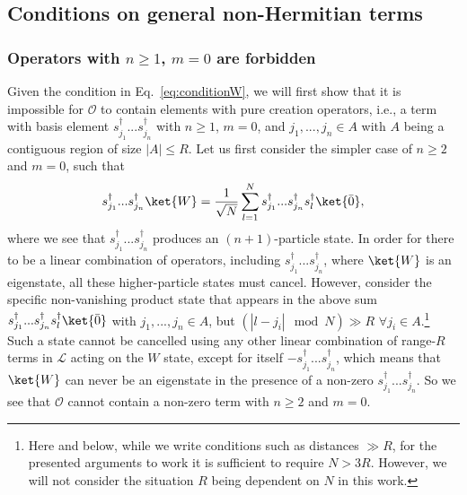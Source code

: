 \documentclass[prx,letterpaper,aps,superscriptaddress,floatfix,twocolumn,nofootinbib]{revtex4-2}
\theoremstyle{definition}
\begin{document}
%
\subsection{Conditions on general non-Hermitian terms}\label{sec:nHconditions}
%
\subsubsection{Operators with $n\geq1$, $m= 0$ are forbidden}
\label{sec:creationforbidden}
%
Given the condition in Eq.~\eqref{eq:conditionW}, we will first show that it is impossible for $\mathcal{O}$ to contain elements with pure creation operators, i.e., a term with basis element $s^\dag_{j_1}...s^\dag_{j_n}$ 
with $n\geq 1$, $m=0$, and $j_1,...,j_n\in A$ with $A$ being a contiguous region of size $|A|\leq R$.
%
Let us first consider the simpler case of $n\geq 2$ and $m=0$, such that
\begin{equation}
s^\dag_{j_1}...s^\dag_{j_n}\ket{W}=\frac{1}{\sqrt{N}}\sum_{l=1}^N s^\dag_{j_1}...s^\dag_{j_n}s_l^\dag\ket{\bar{0}},
\end{equation}
where we see that $s^\dag_{j_1}...s^\dag_{j_n}$ produces an $(n+1)$-particle state.
%
In order for there to be a linear combination of operators, including $s^\dag_{j_1}...s^\dag_{j_n}$, where $\ket{W}$ is an eigenstate, all these higher-particle states must cancel.
%
However, consider the specific non-vanishing product state that appears in the above sum
$s^\dag_{j_1}...s^\dag_{j_n}s_l^\dag\ket{\bar{0}}$
with $j_1,...,j_n\in A$, but $(|l-j_i|\mod N)\gg R$ $\forall j_i\in A$.\footnote{Here and below, while we write conditions such as distances $\gg R$, for the presented arguments to work it is sufficient to require $N > 3R$. However, we will not consider the situation $R$ being dependent on $N$ in this work.}
%
Such a state cannot be cancelled using any other linear combination of range-$R$ terms in $\mathcal{L}$ acting on the $W$ state, except for itself $-s^\dag_{j_1}...s^\dag_{j_n}$, which means that $\ket{W}$ can never be an eigenstate in the presence of a non-zero $s^\dag_{j_1}...s^\dag_{j_n}$.
%
So we see that $\mathcal{O}$ cannot contain a non-zero term with $n\geq 2$ and $m=0$.
%
\end{document}
